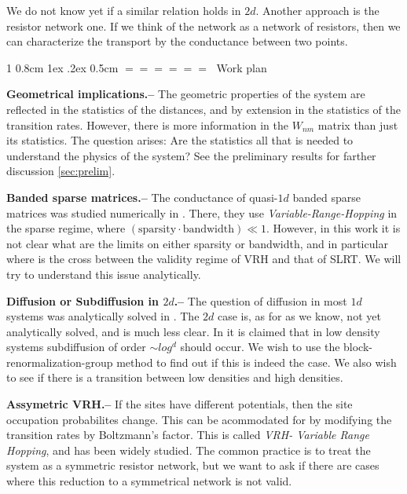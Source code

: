 \documentclass[onecolumn,fleqn,notitlepage,secnumarabic]{revtex4}
\makeatletter
\def\section{%
  \@startsection
    {section}%
    {1}%
    {\z@}%
    {0.8cm \@plus1ex \@minus .2ex}%
    {0.5cm}%
    {\Large\bf $=\!=\!=\!=\!=\!=\;$}%
}%
\makeatother
\begin{document}
We do not know yet if a similar relation holds in $2d$. Another approach is the resistor network one. If we think of the network as a network of resistors, then we can characterize the transport by the conductance between two points. 

\section{Work plan}


{ \bf Geometrical implications.-- } The geometric properties of the system are reflected in the statistics of the distances, and by extension in the statistics of the transition rates. However, there is more information in the $W_{nm}$ matrix than just its statistics. The question arises: Are the statistics all that is needed to understand the physics of the system? See the preliminary results for farther discussion \ref{sec:prelim}.

{ \bf Banded sparse matrices.-- } The conductance of quasi-$1d$ banded sparse matrices was studied numerically in \cite{Stotland:2010:PRB}. There, they use \emph{Variable-Range-Hopping} in the sparse regime, where 
$(\text{sparsity}\cdot \text{bandwidth}) \ll 1$. However, in this work it is not clear what are the limits on either sparsity or bandwidth, and in particular where is the cross between the validity regime of VRH and that of SLRT. We will try to understand this issue analytically.

{ \bf Diffusion or Subdiffusion in $2d$.-- } The question of diffusion in most $1d$ systems was analytically solved in \cite{Alexander:1981:RMP}. The $2d$ case is, as for as we know, not yet analytically solved, and is much less clear. In \cite{Amir:2010:PRL} it is claimed that in low density systems subdiffusion of order $\sim log^d$ should occur. We wish to use the block-renormalization-group method to find out if this is indeed the case. We also wish to see if there is a transition between low densities and high densities.

{\bf Assymetric VRH.--} If the sites have different potentials, then the site occupation probabilites change. This can be acommodated for by modifying the transition rates by Boltzmann's factor. This is called \emph{VRH- Variable Range Hopping}\cite{Ambegaokar:1971}, and has been widely studied. The common practice is to treat the system as a symmetric resistor network, but we want to ask if there are cases where this reduction to a symmetrical network is not valid.
\end{document}
